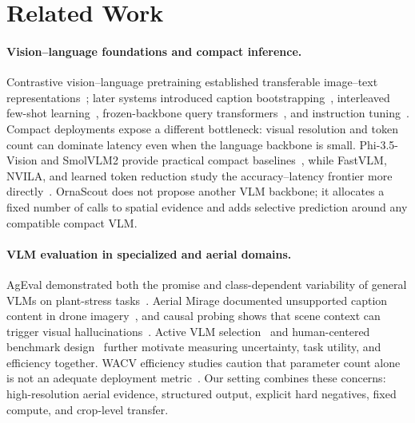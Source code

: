 \section{Related Work}
\paragraph{Vision--language foundations and compact inference.}
Contrastive vision--language pretraining established transferable image--text representations~\cite{radford2021clip}; later systems introduced caption bootstrapping~\cite{li2022blip}, interleaved few-shot learning~\cite{alayrac2022flamingo}, frozen-backbone query transformers~\cite{li2023blip2}, and instruction tuning~\cite{dai2023instructblip,liu2023llava,liu2024llava15}. Compact deployments expose a different bottleneck: visual resolution and token count can dominate latency even when the language backbone is small. Phi-3.5-Vision and SmolVLM2 provide practical compact baselines~\cite{microsoft2024phi35vision,huggingface2025smolvlm2}, while FastVLM, NVILA, and learned token reduction study the accuracy--latency frontier more directly~\cite{vasu2025fastvlm,liu2025nvila,zhao2025token}. OrnaScout does not propose another VLM backbone; it allocates a fixed number of calls to spatial evidence and adds selective prediction around any compatible compact VLM.

\paragraph{VLM evaluation in specialized and aerial domains.}
AgEval demonstrated both the promise and class-dependent variability of general VLMs on plant-stress tasks~\cite{arshad2025ageval}. Aerial Mirage documented unsupported caption content in drone imagery~\cite{basak2025aerial}, and causal probing shows that scene context can trigger visual hallucinations~\cite{huang2025frisbee}. Active VLM selection~\cite{safaei2025activevlm} and human-centered benchmark design~\cite{jiang2025atbench} further motivate measuring uncertainty, task utility, and efficiency together. WACV efficiency studies caution that parameter count alone is not an adequate deployment metric~\cite{nauen2025transformer}. Our setting combines these concerns: high-resolution aerial evidence, structured output, explicit hard negatives, fixed compute, and crop-level transfer.

